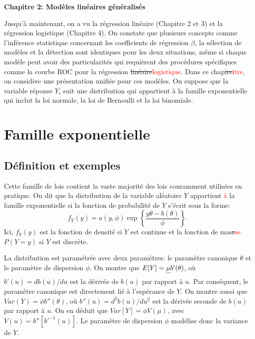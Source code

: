 \documentclass[11pt]{article}
\begin{document}
\begin{center}
{\textbf{\LARGE Chapitre 2: Mod\`eles lin\'eaires g\'en\'eralis\'es}}
\end{center}

\tableofcontents
\newpage

\noindent Jusqu'\`a maintenant, on a vu la r\'egression lin\'eaire (Chapitre 2 et 3) et la r\'egression logistique (Chapitre 4). On constate que plusieurs concepts comme l'inf\'erence statistique concernant les coefficients de r\'egression $\beta$, la s\'election de mod\`eles et la d\'etection sont identiques pour les deux situations, m\^eme si chaque mod\`ele peut avoir des particularit\'es qui requi\`erent des proc\'edures sp\'ecifiques comme la courbe ROC pour la r\'egression \sout{lin\'eaire}\textcolor{red}{logistique}. Dans ce chap\sout{ire}\textcolor{red}{itre}, on consid\`ere une pr\'esentation unifi\'ee pour ces mod\`eles. On suppose que la variable r\'eponse $Y_i$ suit une distribution qui appartient \`a la famille exponentielle qui inclut la loi normale, la loi de Bernoulli et la loi binomiale.

\section{Famille exponentielle}

\subsection{D\'efinition et exemples}

Cette famille de lois contient la vaste majorit\'e des lois couramment utilis\'ees en pratique. On dit que la distribution de la variable al\'eatoire $Y$ appartient \textcolor{red}{\`a} la famille exponentielle si la fonction de probabilit\'e de $Y$ s'\'ecrit sous la forme:
$$f_Y(y) = a(y,\phi) \exp\left\{\frac{y\theta-b(\theta)}{\phi}\right\}.$$
\noindent Ici, $f_Y(y)$ est la fonction de densit\'e si $Y$ est continue et la fonction de mas\sout{s}\textcolor{red}{se} $P(Y=y)$ si $Y$ est discr\`ete.

\noindent La distribution est param\'etr\'ee avec deux param\`etres: le param\`etre canonique $\theta$ et le param\`etre de dispersion $\phi$. On montre que $E[Y]=\sout{\mu }b'(\theta)$, o\`u $b'(u)=db(u)/du$ est la d\'eriv\'ee de $b(u)$ par rapport \`a $u$. Par cons\'equent, le param\`etre canonique est directement li\'e \`a l'esp\'erance de $Y$. On montre aussi que $Var(Y)=\phi b''(\theta)$, o\`u $b''(u)=d^2b(u)/du^2$ est la d\'eriv\'ee seconde de $b(u)$ par rapport \`a $u$. On en d\'eduit que $Var[Y]=\phi V(\mu)$, avec $V(u)=b''[{b'}^{-1}(u)]$. Le param\`etre de dispersion $\phi$ mod\'elise donc la variance de $Y$.
\end{document}
